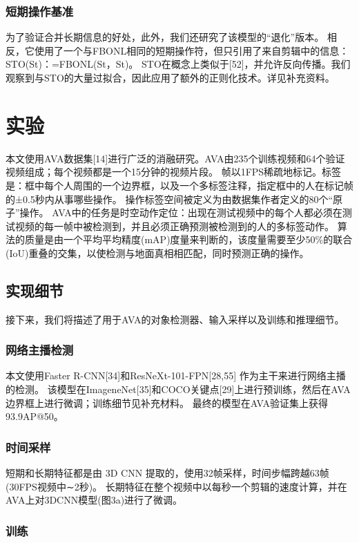 \subsubsection{短期操作基准}
为了验证合并长期信息的好处，此外，我们还研究了该模型的“退化”版本。
相反，它使用了一个与FBONL相同的短期操作符，但只引用了来自剪辑中的信息：STO(St)：=FBONL(St，St)。
STO在概念上类似于[52]，并允许反向传播。我们观察到与STO的大量过拟合，因此应用了额外的正则化技术。详见补充资料。

\section{实验}

本文使用AVA数据集[14]进行广泛的消融研究。AVA由235个训练视频和64个验证视频组成；每个视频都是一个15分钟的视频片段。
帧以1FPS稀疏地标记。标签是：框中每个人周围的一个边界框，以及一个多标签注释，指定框中的人在标记帧的±0.5秒内从事哪些操作。
操作标签空间被定义为由数据集作者定义的80个“原子”操作。
AVA中的任务是时空动作定位：出现在测试视频中的每个人都必须在测试视频的每一帧中被检测到，并且必须正确预测被检测到的人的多标签动作。
算法的质量是由一个平均平均精度(mAP)度量来判断的，该度量需要至少50\%的联合(IoU)重叠的交集，以使检测与地面真相相匹配，同时预测正确的操作。

\subsection{实现细节}

接下来，我们将描述了用于AVA的对象检测器、输入采样以及训练和推理细节。

\subsubsection{网络主播检测}
本文使用Faster R-CNN[34]和ResNeXt-101-FPN[28,55] 作为主干来进行网络主播的检测。
该模型在ImageneNet[35]和COCO关键点[29]上进行预训练，然后在AVA边界框上进行微调；训练细节见补充材料。
最终的模型在AVA验证集上获得93.9AP@50。

\subsubsection{时间采样}
短期和长期特征都是由 3D CNN 提取的，使用32帧采样，时间步幅跨越63帧(30FPS视频中∼2秒)。
长期特征在整个视频中以每秒一个剪辑的速度计算，并在AVA上对3DCNN模型(图3a)进行了微调。

\subsubsection{训练}

